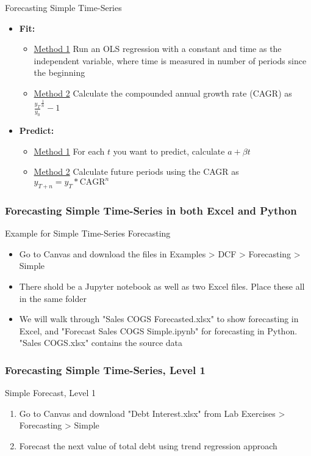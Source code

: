 \documentclass[handout, 11pt]{beamer}
\begin{document}
\begin{section}{Forecasting Simple Time-Series}
\begin{frame}
\vfill
\begin{itemize}
\item \textbf{Fit:}
\begin{itemize}
\item \underline{Method 1}
Run an OLS regression with a constant and time as the independent variable, where time is measured in number of periods since the beginning
\item \underline{Method 2}
Calculate the compounded annual growth rate (CAGR) as
$\frac{y_T}{y_0}^{\frac{1}{n}} - 1$
\end{itemize}
\vfill
\item \textbf{Predict:}
\begin{itemize}
\item \underline{Method 1}
For each $t$ you want to predict, calculate $a + \beta t$
\item \underline{Method 2}
Calculate future periods using the CAGR as
$y_{T + n} = y_T * \text{CAGR}^n$
\end{itemize}
\end{itemize}
\end{frame}
\begin{frame}
\frametitle{Forecasting Simple Time-Series in both Excel and Python}
{
\begin{block}{Example for Simple Time-Series Forecasting}
\begin{itemize}
\item Go to Canvas and download the files in Examples > DCF > Forecasting > Simple
\item There shold be a Jupyter notebook as well as two Excel files. Place these all in the same folder
\item We will walk through "Sales COGS Forecasted.xlsx" to show forecasting in Excel, and "Forecast Sales COGS Simple.ipynb" for forecasting in Python. "Sales COGS.xlsx" contains the source data
\end{itemize}
\end{block}
}
\end{frame}
\begin{frame}
\frametitle{Forecasting Simple Time-Series, Level 1}
{
\begin{block}{Simple Forecast, Level 1}
\begin{enumerate}
\item Go to Canvas and download "Debt Interest.xlsx" from Lab Exercises > Forecasting > Simple
\item Forecast the next value of total debt using trend regression approach

\end{enumerate}
\end{block}}
\end{frame}
\end{section}
\end{document}
